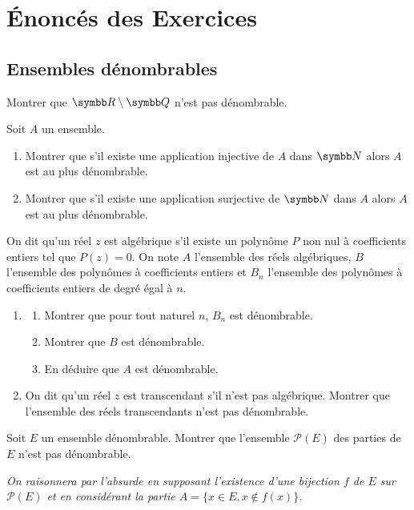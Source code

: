 \section{Énoncés des Exercices}
\subsection{Ensembles dénombrables}

\begin{exercice}
    Montrer que $\R \setminus \Q$ n'est pas dénombrable.
\end{exercice}

\begin{exercice}
    Soit $A$ un ensemble.
    \begin{enumerate}
        \item Montrer que s'il existe une application injective de $A$ dans $\N$ alors $A$ est au plus dénombrable.
        \item Montrer que s'il existe une application surjective de $\N$ dans $A$ alors $A$ est au plus dénombrable.
    \end{enumerate}
\end{exercice}

\begin{exercice}
    On dit qu'un réel $z$ est algébrique s'il existe un polynôme $P$ non nul à coefficients entiers tel que $P(z)=0$.
    On note $A$ l'ensemble des réels algébriques, $B$ l'ensemble des polynômes à coefficients entiers 
    et $B_{n}$ l'ensemble des polynômes à coefficients entiers de degré égal à $n$.
    \begin{enumerate}
        \item 
        \begin{enumerate}
            \item Montrer que pour tout naturel $n$, $B_{n}$ est dénombrable.
            \item Montrer que $B$ est dénombrable.
            \item En déduire que $A$ est dénombrable.
        \end{enumerate}
        \item On dit qu'un réel $z$ est transcendant s'il n'est pas algébrique. 
            Montrer que l'ensemble des réels transcendants n'est pas dénombrable.
    \end{enumerate}
\end{exercice}

\begin{exercice}
    Soit $E$ un ensemble dénombrable. Montrer que l'ensemble $\mathcal{P}(E)$ des parties de $E$ n'est pas dénombrable.
    
    \textit{On raisonnera par l'absurde en supposant l'existence d'une bijection $f$ de $E$ sur $\mathcal{P}(E)$ 
    et en considérant la partie $A=\{x\in E, x\notin f(x)\}$.}
\end{exercice}

